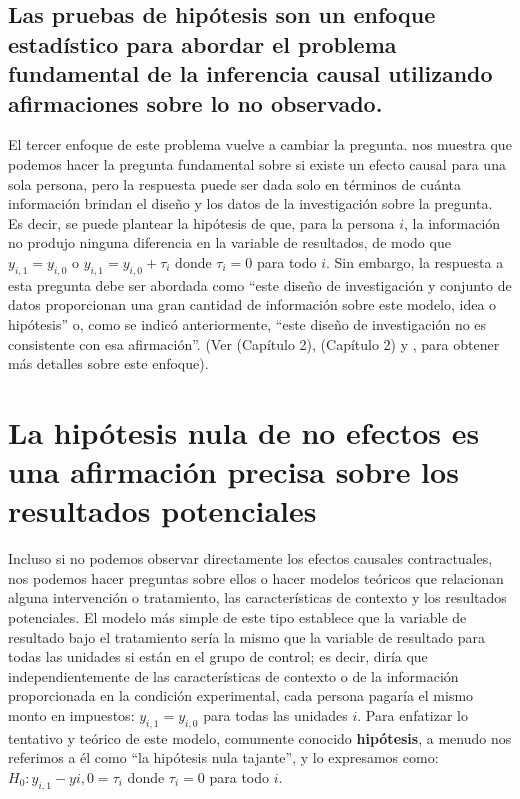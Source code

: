 \documentclass[
]{article}
\begin{document}
\hypertarget{las-pruebas-de-hipuxf3tesis-son-un-enfoque-estaduxedstico-para-abordar-el-problema-fundamental-de-la-inferencia-causal-utilizando-afirmaciones-sobre-lo-no-observado.}{%
\subsection{Las pruebas de hipótesis son un enfoque estadístico para abordar el problema fundamental de la inferencia causal utilizando afirmaciones sobre lo no observado.}\label{las-pruebas-de-hipuxf3tesis-son-un-enfoque-estaduxedstico-para-abordar-el-problema-fundamental-de-la-inferencia-causal-utilizando-afirmaciones-sobre-lo-no-observado.}}

El tercer enfoque de este problema vuelve a cambiar la pregunta.
\textcite[Capítulo 2]{fisher:1935} nos muestra que podemos hacer la pregunta fundamental
sobre si existe un efecto causal para una sola persona, pero la respuesta puede ser dada solo en términos de cuánta información brindan el diseño y los datos de la investigación sobre la pregunta. Es decir, se puede plantear la hipótesis de que, para la persona \(i\), la información no produjo ninguna diferencia en la variable de resultados, de modo que \(y_{i, 1} = y_{i, 0}\)
o \(y_{i, 1} = y_{i, 0} + \tau_i\) donde \(\tau_i = 0\) para todo \(i\). Sin embargo, la respuesta a esta pregunta debe ser abordada como ``este diseño de investigación y conjunto de datos proporcionan una gran cantidad de información sobre este modelo, idea o hipótesis'' o, como se indicó anteriormente, ``este diseño de investigación no es consistente con esa afirmación''. (Ver
\textcite{rosenbaum2002}(Capítulo 2), \textcite{rosenbaum2010}(Capítulo 2) y
\textcite{rosenbaum2017observation}, para obtener más detalles sobre este enfoque).

\hypertarget{la-hipuxf3tesis-nula-de-no-efectos-es-una-afirmaciuxf3n-precisa-sobre-los-resultados-potenciales}{%
\section{La hipótesis nula de no efectos es una afirmación precisa sobre los resultados potenciales}\label{la-hipuxf3tesis-nula-de-no-efectos-es-una-afirmaciuxf3n-precisa-sobre-los-resultados-potenciales}}

Incluso si no podemos observar directamente los efectos causales contractuales, nos podemos hacer preguntas sobre ellos o hacer modelos teóricos
que relacionan alguna intervención o tratamiento, las características de contexto y
los resultados potenciales. El modelo más simple de este tipo establece que la variable de resultado bajo el tratamiento sería la mismo que la variable de resultado para todas las unidades si están en el grupo de control; es decir, diría que independientemente de las características de contexto o de la información proporcionada en la condición experimental, cada persona pagaría el mismo monto en impuestos: \(y_ {i, 1} = y_ {i, 0}\) para todas las unidades \(i\). Para enfatizar lo tentativo y teórico de este modelo, comumente conocido \textbf{hipótesis}, a menudo nos referimos a él como ``la hipótesis nula tajante'', y lo expresamos como: \(H_0: y_{i, 1} -y{i, 0} = \tau_i\) donde \(\tau_i = 0\) para todo \(i\).
\end{document}
